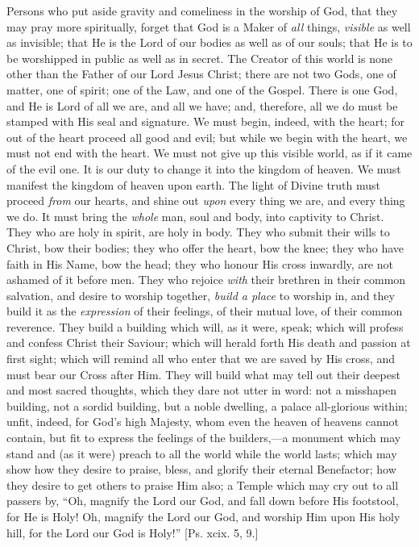 Persons who put aside gravity and comeliness in the worship of God,
that they may pray more spiritually, forget that God is a Maker of \emph{all}
things, \emph{visible} as well as invisible; that He is the Lord of
our bodies as well as of our souls; that He is to be worshipped in
public as well as in secret. The Creator of this world is none other
than the Father of our Lord Jesus Christ; there are not two Gods, one
of matter, one of spirit; one of the Law, and one of the Gospel. There
is one God, and He is Lord of all we are, and all we have; and,
therefore, all we do must be stamped with His seal and signature. We
must begin, indeed, with the heart; for out of the heart proceed all
good and evil; but while we begin with the heart, we must not end with
the heart. We must not give up this visible world, as if it came of
the evil one. It is our duty to change it into the kingdom of heaven.
We must manifest the kingdom of heaven upon earth. The light of Divine
truth must proceed \emph{from} our hearts, and shine out \emph{upon}
every thing we are, and every thing we do. It must bring the \emph{whole}
man, soul and body, into captivity to Christ. They who are holy in
spirit, are holy in body. They who submit their wills to Christ, bow
their bodies; they who offer the heart, bow the knee; they who have
faith in His Name, bow the head; they who honour His cross inwardly,
are not ashamed of it before men. They who rejoice \emph{with} their
brethren in their common salvation, and desire to worship together, \emph{build
a place} to worship in, and they build it as the \emph{expression}
of their feelings, of their mutual love, of their common reverence.
They build a building which will, as it were, speak; which will
profess and confess Christ their Saviour; which will herald forth His
death and passion at first sight; which will remind all who enter that
we are saved by His cross, and must bear our Cross after Him. They
will build what may tell out their deepest and most sacred thoughts,
which they dare not utter in word: not a misshapen building, not a
sordid building, but a noble dwelling, a palace all-glorious within;
unfit, indeed, for God's high Majesty, whom even the heaven of heavens
cannot contain, but fit to express the feelings of the builders,—a
monument which may stand and (as it were) preach to all the world
while the world lasts; which may show how they desire to praise,
bless, and glorify their eternal Benefactor; how they desire to get
others to praise Him also; a Temple which may cry out to all passers
by, ``Oh, magnify the Lord our God, and fall down before His
footstool, for He is Holy! Oh, magnify the Lord our God, and worship
Him upon His holy hill, for the Lord our God is Holy!'' [Ps. xcix.
5, 9.]

